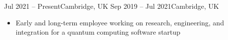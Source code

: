 \documentclass[10pt,a4paper,ragged2e,withhyper]{altacv}
\begin{document}
\begin{paracol}{2}


{Jul 2021 -- Present}{Cambridge, UK}
{Sep 2019 -- Jul 2021}{Cambridge, UK}


% 
% 
% 

% 
% 
% 
% 

% 
% 

% 

% 

\begin{itemize}
    \item Early and long-term employee working on research, engineering, and
    integration for a quantum computing software startup


\end{itemize}
\end{paracol}
\end{document}
